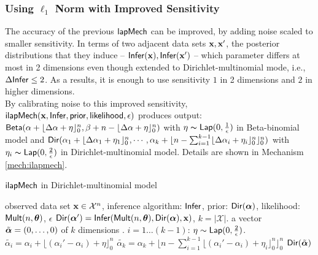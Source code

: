 \documentclass{article}
\begin{document}
\subsubsection{Using $\ell_1$ Norm with Improved Sensitivity}
 The accuracy of the previous $\mathsf{lapMech}$ can be improved, by adding noise scaled to smaller sensitivity.
 In terms of two adjacent data sets $\textbf{x}, \textbf{x}'$, the posterior distributions that they induce -- $\mathsf{Infer}(\textbf{x}), \mathsf{Infer}(\textbf{x}')$ -- which parameter differs at most in 2 dimensions even though extended to Dirichlet-multinomial mode, i.e., $\Delta \mathsf{Infer} \leq 2$. As a results, it is enough to use sensitivity $1$ in 2 dimensions and $2$ in higher dimensions.\\
 By calibrating noise to this improved sensitivity, $\mathsf{ilapMech}(\textbf{x},\mathsf{Infer}, \mathsf{prior}, \mathsf{likelihood}, \epsilon)$ produces output:
 $\mathsf{Beta}(\alpha +  \lfloor{\Delta \alpha + \eta}\rfloor^n_0,\beta + n - \lfloor{\Delta \alpha + \eta}\rfloor^n_0)
$
with $\eta \thicksim \mathsf{Lap}(0, \frac{1}{\epsilon})$ in Beta-binomial model and
$\mathsf{Dir}(\alpha_1 +  \lfloor{\Delta \alpha_1 + \eta_1}\rfloor^n_0, \cdots, 
\alpha_k + \lfloor n - \sum_{i = 1}^{k-1}\lfloor{\Delta \alpha_i + \eta_i}\rfloor^n_0 \rfloor^n_0)
$
with $\eta_i \thicksim \mathsf{Lap}(0, \frac{2}{\epsilon})$ in Dirichlet-multinomial model. Details are shown in Mechanism \ref{mech:ilapmech}.
  \begin{algorithm}
  \caption{$\mathsf{ilapMech}$ in Dirichlet-multinomial model}
  \label{mech:ilapmech}
  \begin{algorithmic}
  \REQUIRE observed data set $\textbf{x} \in \mathcal{X}^n$, inference algorithm: $\mathsf{Infer}$, 
  prior: $\mathsf{Dir}(\boldsymbol{\alpha})$, likelihood: $\mathsf{Mult}(n, \boldsymbol{\theta})$, $\epsilon$
  \STATE {} $\mathsf{Dir}(\boldsymbol{\alpha}') = \mathsf{Infer}(\mathsf{Mult}(n, \boldsymbol{\theta}), \mathsf{Dir}(\boldsymbol{\alpha}), \textbf{x})$, $k = |\mathcal{X}|$.
  \STATE {} a vector $\tilde{\boldsymbol{\alpha}} = (0, \dots, 0 )$ of $k$ dimensions .
  \STATE {} $i = 1 \dots (k - 1)$:
  \STATE \quad {} $\eta \sim \mathsf{Lap}(0, \frac{2}{\epsilon})$.
  \STATE \quad \quad  $\tilde{\alpha_i}=\alpha_i + \lfloor{(\alpha_i' - \alpha_i) + \eta}\rfloor^n_0$ 
  \STATE \quad $\tilde{\alpha_k} = \alpha_k + \lfloor n - \sum_{i = 1}^{k-1}\lfloor{(\alpha_i' - \alpha_i) + \eta_i}\rfloor^n_0 \rfloor^n_0$
  \ENSURE $\mathsf{Dir}(\tilde{\boldsymbol{\alpha}})$
  \end{algorithmic}
  \end{algorithm}
\end{document}
